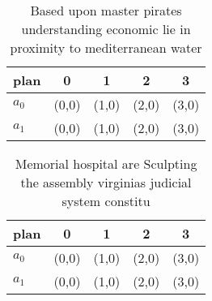\documentclass[a4paper]{article}
\begin{document}
\begin{table}
\begin{adjustbox}{width=0.5\columnwidth}
\begin{tabular}{|l|l|l|l|l|}
\hline
\textbf{plan} & \multicolumn{1}{c|}{\textbf{0}} & \multicolumn{1}{c|}{\textbf{1}} & \multicolumn{1}{c|}{\textbf{2}} & \multicolumn{1}{c|}{\textbf{3}} \\ \hline
\textbf{$a_0$}  & (0,0) & (1,0) & (2,0) & (3,0) \\ \hline
\textbf{$a_1$}  & (0,0) & (1,0) & (2,0) & (3,0) \\ \hline
\end{tabular}
\end{adjustbox}
\caption{Based upon master pirates understanding economic lie in proximity to mediterranean water 
}
\end{table}

\begin{table}
\begin{adjustbox}{width=0.5\columnwidth}
\begin{tabular}{|l|l|l|l|l|}
\hline
\textbf{plan} & \multicolumn{1}{c|}{\textbf{0}} & \multicolumn{1}{c|}{\textbf{1}} & \multicolumn{1}{c|}{\textbf{2}} & \multicolumn{1}{c|}{\textbf{3}} \\ \hline
\textbf{$a_0$}  & (0,0) & (1,0) & (2,0) & (3,0) \\ \hline
\textbf{$a_1$}  & (0,0) & (1,0) & (2,0) & (3,0) \\ \hline
\end{tabular}
\end{adjustbox}
\caption{Memorial hospital are Sculpting the assembly virginias judicial system constitu
}
\end{table}
\end{document}
